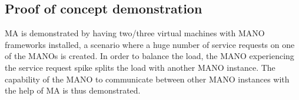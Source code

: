 \subsection{Proof of concept demonstration}
MA is demonstrated by having two/three virtual machines with MANO frameworks installed, a scenario where a huge number of service requests on one of the MANOs is created. In order to balance the load, the MANO experiencing the service request spike splits the load with another MANO instance. The capability of the MANO to communicate between other MANO instances with the help of MA is thus demonstrated.
